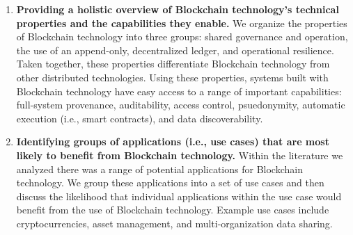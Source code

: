 \begin{enumerate}
	\item \textbf{Providing a holistic overview of Blockchain technology's technical properties and the capabilities they enable.}
	We organize the properties of Blockchain technology into three groups: shared governance and operation, the use of an append-only, decentralized ledger, and operational resilience.
	Taken together, these properties differentiate Blockchain technology from other distributed technologies.
	Using these properties, systems built with Blockchain technology have easy access to a range of important capabilities: full-system provenance, auditability, access control, psuedonymity, automatic execution (i.e., smart contracts), and data discoverability.
	
	
	
	\item \textbf{Identifying groups of applications (i.e., use cases) that are most likely to benefit from Blockchain technology.}
	Within the literature we analyzed there was a range of potential applications for Blockchain technology.
	We group these applications into a set of use cases and then discuss the likelihood that individual applications within the use case would benefit from the use of Blockchain technology.
	Example use cases include cryptocurrencies, asset management, and multi-organization data sharing.
	

\end{enumerate}
